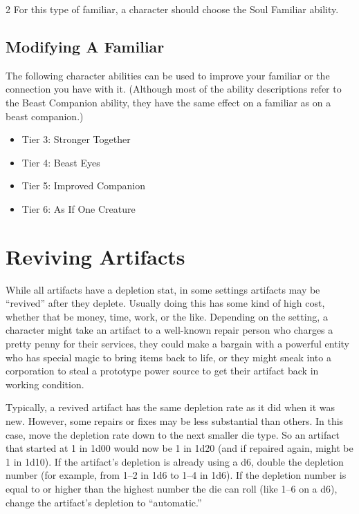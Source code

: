 \begin{multicols}{2}
For this type of familiar, a character should choose the Soul Familiar ability.

\section{Modifying A Familiar}
 
The following character abilities can be used to improve your familiar or the connection you have with it. (Although most of the ability descriptions refer to the Beast Companion ability, they have the same effect on a familiar as on a beast companion.) 

\begin{itemize} 
\item Tier 3: Stronger Together 
\item Tier 4: Beast Eyes 
\item Tier 5: Improved Companion
\item Tier 6: As If One Creature
\end{itemize}

\chapter{Reviving Artifacts}

While all artifacts have a depletion stat, in some settings artifacts may be “revived” after they deplete. Usually doing this has some kind of high cost, whether that be money, time, work, or the like. Depending on the setting, a character might take an artifact to a well-known repair person who charges a pretty penny for their services, they could make a bargain with a powerful entity who has special magic to bring items back to life, or they might sneak into a corporation to steal a prototype power source to get their artifact back in working condition.

Typically, a revived artifact has the same depletion rate as it did when it was new. However, some repairs or fixes may be less substantial than others. In this case, move the depletion rate down to the next smaller die type. So an artifact that started at 1 in 1d00 would now be 1 in 1d20 (and if repaired again, might be 1 in 1d10). If the artifact’s depletion is already using a d6, double the depletion number (for example, from 1–2 in 1d6 to 1–4 in 1d6). If the depletion number is equal to or higher than the highest number the die can roll (like 1–6 on a d6), change the artifact’s depletion to “automatic.”


\end{multicols}

